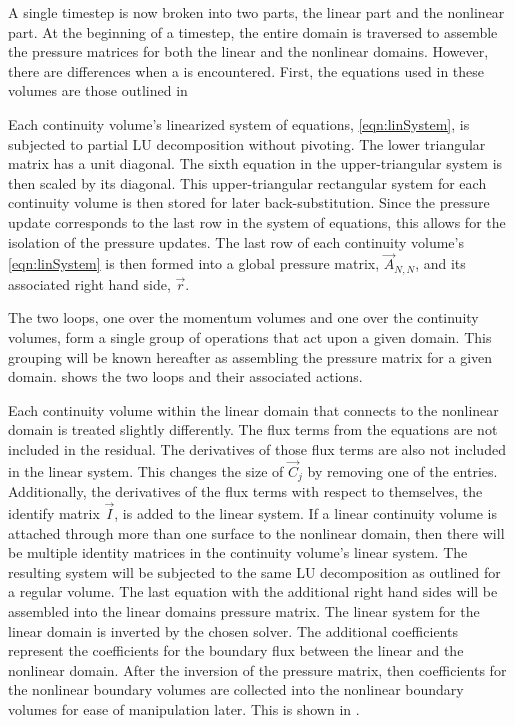 A single timestep is now broken into two parts, the linear part and the nonlinear part.
At the beginning of a timestep, the entire domain is traversed to assemble the pressure matrices for both the linear and the nonlinear domains.
However, there are differences when a  is encountered.
First, the equations used in these volumes are those outlined in 

Each continuity volume's linearized system of equations, \eqref{eqn:linSystem}, is subjected to partial LU decomposition without pivoting.
The lower triangular matrix has a unit diagonal.
The sixth equation in the upper-triangular system is then scaled by its diagonal.
This upper-triangular rectangular system for each continuity volume is then stored for later back-substitution.
Since the pressure update corresponds to the last row in the system of equations, this allows for the isolation of the pressure updates.
The last row of each continuity volume's \eqref{eqn:linSystem} is then formed into a global pressure matrix, $\vec{A}_{N,N}$, and its associated right hand side, $\vec{r}$.

The two loops, one over the momentum volumes and one over the continuity volumes, form a single group of operations that act upon a given domain.
This grouping will be known hereafter as assembling the pressure matrix for a given domain.
 shows the two loops and their associated actions.

Each continuity volume within the linear domain that connects to the nonlinear domain is treated slightly differently.
The flux terms from the equations are not included in the residual.
The derivatives of those flux terms are also not included in the linear system.
This changes the size of $\vec{C}_{j}$ by removing one of the entries.
Additionally, the derivatives of the flux terms with respect to themselves, the identify matrix $\vec{I}$, is added to the linear system.
If a linear continuity volume is attached through more than one surface to the nonlinear domain, then there will be multiple identity matrices in the continuity volume's linear system.
The resulting system will be subjected to the same LU decomposition as outlined for a regular volume.
The last equation with the additional right hand sides will be assembled into the linear domains pressure matrix.
The linear system for the linear domain is inverted by the chosen solver.
The additional coefficients represent the coefficients for the boundary flux between the linear and the nonlinear domain.
After the inversion of the pressure matrix, then coefficients for the nonlinear boundary volumes are collected into the nonlinear boundary volumes for ease of manipulation later.
This is shown in .

